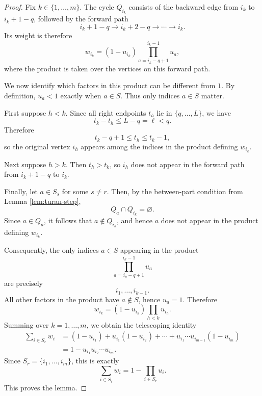 \documentclass[10pt,a4paper]{amsart}
\begin{document}
\begin{proof}
Fix $k\in\{1,\ldots,m\}$. The cycle $Q_{i_k}$ consists of the backward edge
from $i_k$ to $i_k+1-q$, followed by the forward path
\[
        i_k+1-q\to i_k+2-q\to\cdots\to i_k.
\]
Its weight is therefore
\[
        w_{i_k}=(1-u_{i_k})
        \prod_{a=i_k-q+1}^{i_k-1}u_a,
\]
where the product is taken over the vertices on this forward path.

We now identify which factors in this product can be different from $1$. By
definition, $u_a<1$ exactly when $a\in S$. Thus only indices $a\in S$ matter.

First suppose $h<k$. Since all right endpoints $t_h$ lie in
$\{q,\ldots,L\}$, we have
\[
        t_k-t_h\le L-q=\ell<q.
\]
Therefore
\[
        t_k-q+1\le t_h\le t_k-1,
\]
so the original vertex $i_h$ appears among the indices in the product
defining $w_{i_k}$.

Next suppose $h>k$. Then $t_h>t_k$, so $i_h$ does not appear in the forward
path from $i_k+1-q$ to $i_k$.

Finally, let $a\in S_s$ for some $s\ne r$. Then, by the between-part condition
from Lemma \ref{lem:turan-step},
\[
        Q_a\cap Q_{i_k}=\varnothing.
\]
Since $a\in Q_a$, it follows that $a\notin Q_{i_k}$, and hence $a$ does not
appear in the product defining $w_{i_k}$.

Consequently, the only indices $a\in S$ appearing in the product
\[
        \prod_{a=i_k-q+1}^{i_k-1}u_a
\]
are precisely
\[
        i_1,\ldots,i_{k-1}.
\]
All other factors in the product have $a\notin S$, hence $u_a=1$. Therefore
\[
        w_{i_k}=(1-u_{i_k})\prod_{h<k}u_{i_h}.
\]
Summing over $k=1,\ldots,m$, we obtain the telescoping identity
\[
\begin{aligned}
        \sum_{i\in S_r}w_i
        &=(1-u_{i_1})
          +u_{i_1}(1-u_{i_2})
          +\cdots
          +u_{i_1}\cdots u_{i_{m-1}}(1-u_{i_m})\\
        &=1-u_{i_1}u_{i_2}\cdots u_{i_m}.
\end{aligned}
\]
Since $S_r=\{i_1,\ldots,i_m\}$, this is exactly
\[
        \sum_{i\in S_r}w_i=1-\prod_{i\in S_r}u_i.
\]
This proves the lemma.
\end{proof}
\end{document}
